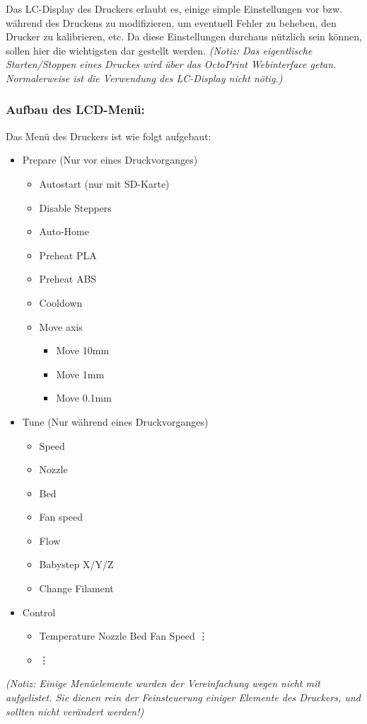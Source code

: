 Das LC-Display des Druckers erlaubt es, einige simple Einstellungen vor bzw. während des Druckens zu modifizieren, um eventuell Fehler zu beheben, den Drucker zu kalibrieren, etc. Da diese Einstellungen durchaus nützlich sein können, sollen hier die wichtigsten dar gestellt werden. \emph{(Notiz: Das eigentlische Starten/Stoppen eines Druckes wird über das OctoPrint Webinterface getan. Normalerweise ist die Verwendung des LC-Display nicht nötig.)}

\subsubsection{Aufbau des LCD-Menü:}
Das Menü des Druckers ist wie folgt aufgebaut:
\begin{itemize}[noitemsep]
	\item Prepare (Nur vor eines Druckvorganges)
	\begin{itemize}[noitemsep]
		\item Autostart (nur mit SD-Karte)
		\item Disable Steppers
		\item Auto-Home
		\item Preheat PLA
		\item Preheat ABS
		\item Cooldown
		\item Move axis
		\begin{itemize}
			\item Move 10mm 
			\item Move 1mm
			\item Move 0.1mm
		\end{itemize}
	\end{itemize}
	\item Tune (Nur während eines Druckvorganges)
	\begin{itemize}[noitemsep] 
		\item Speed
		\item Nozzle
		\item Bed
		\item Fan speed
		\item Flow
		\item Babystep X/Y/Z
		\item Change Filament
	\end{itemize}
	\item Control
	\begin{itemize}[noitemsep]
		\item Temperature
			\subitem Nozzle
			\subitem Bed
			\subitem Fan Speed
			\subitem \vdots
		\item \hspace{0.1pt} \vdots
	\end{itemize}
\end{itemize}
\emph{(Notiz: Einige Menüelemente wurden der Vereinfachung wegen nicht mit aufgelistet. Sie dienen rein der Feinsteuerung einiger Elemente des Druckers, und sollten nicht verändert werden!)}


